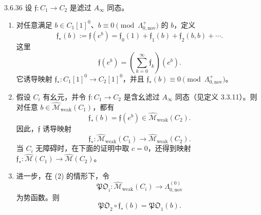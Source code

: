 \begin{lemma}{3.6.36}\label{lem:3-6-36}
设 $\mathfrak f\colon C_1\to C_2$ 是滤过 $A_\infty$ 同态。
\begin{enumerate}[label=\textup{(\arabic*)},leftmargin=2.8em]
  \item 对任意满足
  $b\in C_1[1]^0$、$b\equiv0\pmod{\Lambda^+_{0,\mathrm{nov}}}$ 的 $b$，定义
  \begin{equation}
    \mathfrak f_*(b):=\mathfrak f(e^b)
    =\mathfrak f_0(1)+\mathfrak f_1(b)+\mathfrak f_2(b,b)+\cdots.
    \tag{3.6.37}\label{eq:3-6-37}
  \end{equation}
  这里
  \[
    \mathfrak f(e^b)=\left(\sum_{k=0}^{\infty}\mathfrak f_k\right)(e^b).
  \]
  它诱导映射 $\mathfrak f_*\colon C_1[1]^0\to C_2[1]^0$，并且
  $\mathfrak f_*(b)\equiv0\pmod{\Lambda^+_{0,\mathrm{nov}}}$。

  \item 假设 $C_i$ 有幺元，并令
  $\mathfrak f\colon C_1\to C_2$ 是含幺滤过 $A_\infty$ 同态（见定义
  3.3.11）。则对任意
  $b\in\widehat{\mathcal M}_{\mathrm{weak}}(C_1)$，都有
  \[
    \mathfrak f_*(b)=\mathfrak f(e^b)
    \in\widehat{\mathcal M}_{\mathrm{weak}}(C_2).
  \]
  因此，$\mathfrak f$ 诱导映射
  \[
    \mathfrak f_*\colon
    \widehat{\mathcal M}_{\mathrm{weak}}(C_1)
    \longrightarrow\widehat{\mathcal M}_{\mathrm{weak}}(C_2).
  \]
  当 $C_i$ 无障碍时，在下面的证明中取 $c=0$，还得到映射
  $\mathfrak f_*\colon\widehat{\mathcal M}(C_1)\longrightarrow
  \widehat{\mathcal M}(C_2)$。

  \item 进一步，在 (2) 的情形下，令
  \[
    \mathfrak{PO}_i\colon
    \widehat{\mathcal M}_{\mathrm{weak}}(C_i)
    \longrightarrow\Lambda_{0,\mathrm{nov}}^{(0)}
  \]
  为势函数。则
  \[
    \mathfrak{PO}_2\circ\mathfrak f_*(b)=\mathfrak{PO}_1(b).
  \]
\end{enumerate}
\end{lemma}

